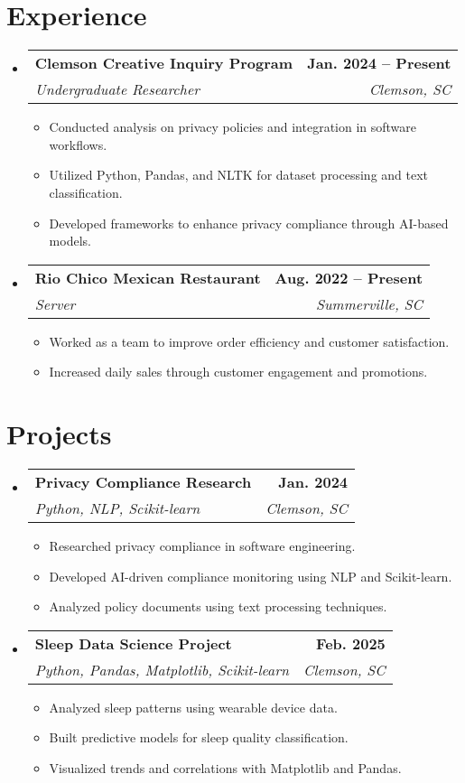 \documentclass[letterpaper,11pt]{article}
\makeatletter
\newcommand{\resumeSubheading}[4]{
    \vspace{-2pt}\item[]
    \begin{tabular*}{1.0\textwidth}[t]{l@{\extracolsep{\fill}}r}
    \textbf{#1} & \textbf{\small #2} \\
    \textit{\small#3} & \textit{\small #4} \\
    \end{tabular*}\vspace{-7pt}
}
\makeatother
\begin{document}
    \section{Experience}
    \begin{itemize}
        \resumeSubheading{Clemson Creative Inquiry Program}{Jan. 2024 -- Present}{Undergraduate Researcher}{Clemson, SC}
        \begin{itemize}
            \item Conducted analysis on privacy policies and integration in software workflows.
            \item Utilized Python, Pandas, and NLTK for dataset processing and text classification.
            \item Developed frameworks to enhance privacy compliance through AI-based models.
        \end{itemize}

        \resumeSubheading{Rio Chico Mexican Restaurant}{Aug. 2022 -- Present}{Server}{Summerville, SC}
        \begin{itemize}
            \item Worked as a team to improve order efficiency and customer satisfaction.
            \item Increased daily sales through customer engagement and promotions.
        \end{itemize}
    \end{itemize}

    \section{Projects}
    \begin{itemize}
        \resumeSubheading{Privacy Compliance Research}{Jan. 2024}{Python, NLP, Scikit-learn}{Clemson, SC}
        \begin{itemize}
            \item Researched privacy compliance in software engineering.
            \item Developed AI-driven compliance monitoring using NLP and Scikit-learn.
            \item Analyzed policy documents using text processing techniques.
        \end{itemize}

        \resumeSubheading{Sleep Data Science Project}{Feb. 2025}{Python, Pandas, Matplotlib, Scikit-learn}{Clemson, SC}
        \begin{itemize}
            \item Analyzed sleep patterns using wearable device data.
            \item Built predictive models for sleep quality classification.
            \item Visualized trends and correlations with Matplotlib and Pandas.
        \end{itemize}
    \end{itemize}
\end{document}
